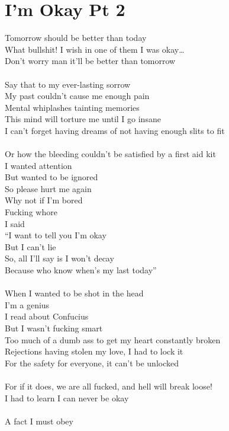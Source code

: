 \documentclass[12pt, b5paper]{article}
\begin{document}
\newpage
\section{I'm Okay Pt 2}
Tomorrow should be better than today
\\What bullshit! I wish in one of them I was okay…
\\Don’t worry man it’ll be better than tomorrow 
\\\\Say that to my ever-lasting sorrow
\\My past couldn’t cause me enough pain 
\\Mental whiplashes tainting memories 
\\This mind will torture me until I go insane 
\\I can’t forget having dreams of not having enough slits to fit 
\\\\Or how the bleeding couldn’t be satisfied by a first aid kit 
\\I wanted attention 
\\But wanted to be ignored 
\\So please hurt me again
\\Why not if I’m bored 
\\Fucking whore 
\\I said 
\\“I want to tell you I’m okay 
\\But I can’t lie 
\\So, all I’ll say is I won’t decay 
\\Because who know when’s my last today”
\\\\When I wanted to be shot in the head
\\I’m a genius 
\\I read about Confucius 
\\But I wasn’t fucking smart 
\\Too much of a dumb ass to get my heart constantly broken
\\Rejections having stolen my love, I had to lock it 
\\For the safety for everyone, it can’t be unlocked
\\\\For if it does, we are all fucked, and hell will break loose!
\\I had to learn I can never be okay 
\\\\A fact I must obey
\end{document}
